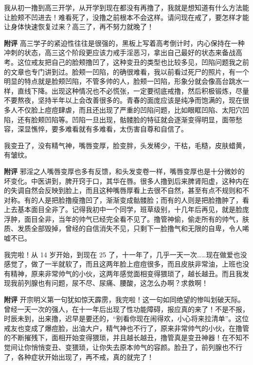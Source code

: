 \begin{case}[变丑]
    我从初一撸到高三开学，从开学到现在都没有再撸了，我就是想知道有什么方法能让脸颊不凹进去！难看死了，没撸之前根本不会这样。请问现在戒了，要怎样才能让身体快速恢复过来？高三了，再不努力就晚了！

    \textbf{附评} 高三学子的紧迫性往往是很强的，黑板上写着高考倒计时，内心保持在一种冲刺的状态，高三这个阶段更应该力戒手淫恶习，拿出自己最好的状态来备战高考。这位戒友把自己的脸颊撸凹了，这种变丑的类型也比较多见，凹陷问题我之前的文章也专门讲到过。脸颊一凹陷，的确很难看，我以前看过死尸的照片，有一个明显的特点就是脸颊凹陷，不管多帅的人，脸颊一凹陷，形象分就会像高台跳水一样，直线下降。出现这种情况也不必慌张，一定要彻底戒撸，然后积极锻炼，尽量不要熬夜，坚持半年以上会改善很多的。青春的面庞应该是纯净而饱满的，现在很多人不仅脸上痘痘肆虐，而且还出现了严重的凹陷问题，比如眼眶凹陷、太阳穴凹陷，还有脸颊凹陷等。凹陷一旦出现，骷髅脸的特征就会逐渐变得明显，面带愁容，深显憔悴，要多难看就有多难看，太伤害自尊和自信了。
\end{case}

\begin{case}[变丑]
    我变丑了，没有精气神，嘴唇变厚，脸变胖，头发稀少，干枯，毛糙，皮肤蜡黄，有皱纹。

    \textbf{附评} 邪淫之人嘴唇变厚也多有反馈，和头发变卷一样，嘴唇变厚也是十分微妙的坏变化。中医讲到，脾开窍于口，其华在唇。很多人撸到后来脾肾阳虚，这种内在的失调自然会反映到脸上，而且这种嘴唇厚看上去很不自然，甚至有点不规则和不对称。有的人是把脸撸瘦撸凹了，渐渐变成骷髅脸；而有的人则是把脸撸肿了，看上去基本面目全非了。记得我初中一个同学，班草级别，十几年后再见，就是脸庞浮肿，面目全非，当年的帅气已经完全看不见了。撸管神偷，偷走所有的帅气，肤质、发质全部毁掉，曾经的自信消失不见，只剩下一脸撸气和无限的自卑，令人唏嘘不已。
\end{case}

\begin{case}[变丑]
    我完啦！从 14 岁开始，到现在 25 了，十一年了，几乎一天一次……现在做爱也没感觉了，做了一半就软了，而且这两年脸上痘痘很多，而且皮肤非常油，上班也没有精神，原来非常帅气的小伙，这两年感觉面相变得猥琐了，越长越丑。而且我发现我前列腺也有问题，尿不尽、尿痛、腰酸，这怎么办啊？求救啊！

    \textbf{附评} 开宗明义第一句犹如惊天霹雳，我完啦！这一句如同绝望的惨叫划破天际。曾经一天一次的强人，在十一年后出现了性功能障碍，报应真的来了！不是不报，时辰未到，出来撸，迟早是要还的，“别看你现在闹得欢，小心将来拉清单”。这位戒友也变成了爆痘脸，出油大户，精气神也不行了，原来非常帅气的小伙，在撸管的不断摧残下，面相开始变得猥琐，并且越长越丑，撸管真是变丑神器！在不知不觉间让你悄悄变丑、变猥琐，让你失去原本帅气的容颜。脸丑了，前列腺也不行了，各种症状开始出现了，再不戒，真的就完了！
\end{case}

